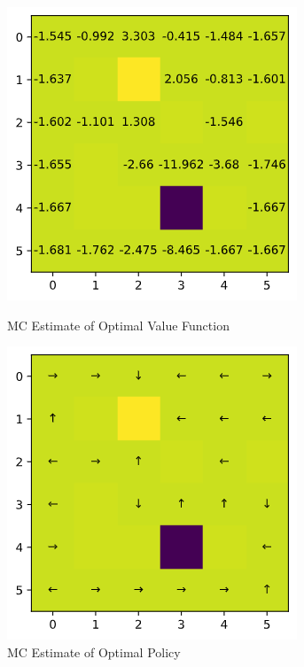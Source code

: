\documentclass[12pt]{article}
\begin{document}
\begin{figure}[H]
  \centering
  \begin{minipage}[b]{0.3\textwidth}
    \includegraphics[width=\textwidth]{figures/2c2_value.png}
    \caption{MC Estimate of Optimal Value Function}
    \label{figure:2c2_value}
  \end{minipage}
  \hspace{3em}
  \begin{minipage}[b]{0.3\textwidth}
    \includegraphics[width=\textwidth]{figures/2c2_policy.png}
    \caption{MC Estimate of Optimal Policy}
    \label{figure:2c2_policy}
  \end{minipage}
\end{figure}
\end{document}
